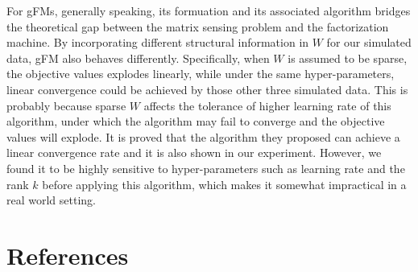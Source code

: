 \documentclass{article}
\begin{document}
For gFMs, generally speaking, its formuation and its associated algorithm bridges the theoretical gap between the matrix sensing problem and the factorization machine. By incorporating different structural information in $W$ for our simulated data, gFM also behaves differently. Specifically, when $W$ is assumed to be sparse, the objective values explodes linearly, while under the same hyper-parameters, linear convergence could be achieved by those other three simulated data. This is probably because sparse $W$ affects the tolerance of higher learning rate of this algorithm, under which the algorithm may fail to converge and the objective values will explode. It is proved that the algorithm they proposed can achieve a linear convergence rate and it is also shown in our experiment. However, we found it to be highly sensitive to hyper-parameters such as learning rate and the rank $k$ before applying this algorithm, which makes it somewhat impractical in a real world setting.


\section*{References}
\small{
\renewcommand{\section}[2]{}%
 

}
\end{document}
